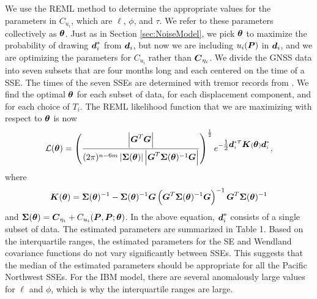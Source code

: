 \documentclass[extra,mreferee]{gji}
\begin{document}

We use the REML method to determine the appropriate values for the
parameters in $C_{u_i}$, which are $\ell$, $\phi$, and $\tau$. We
refer to these parameters collectively as $\mitbf{\theta}$. Just as in
Section \ref{sec:NoiseModel}, we pick $\mitbf{\theta}$ to maximize the
probability of drawing $\data_i^*$ from $\data_i$, but now we are
including $u_i(\points)$ in $\data_i$, and we are optimizing the
parameters for $C_{u_i}$ rather than $\mitbf{C}_{\eta_i}$. We divide
the GNSS data into seven subsets that are four months long and each
centered on the time of a SSE. The times of the seven SSEs are
determined with tremor records from \cite{Wech2010}. We find the
optimal $\mitbf{\theta}$ for each subset of data, for each
displacement component, and for each choice of $T_i$. The REML
likelihood function that we are maximizing with respect to
$\mitbf{\theta}$ is now
\begin{equation}\label{eq:REMLPrior} 
\mathcal{L}(\mitbf{\theta}) =
\left(\frac{\left| \G^T \G \right|}{(2\pi)^{n-6m}
                                    \left| \mitbf{\Sigma}(\mitbf{\theta}) \right| 
                                    \left| \G^T \mitbf{\Sigma}(\mitbf{\theta})^{-1} \G \right|}\right)^{\frac{1}{2}} 
                              e^{-\tfrac{1}{2} \data_i^{*T} \mitbf{K}(\mitbf{\theta}) \data_i^*},
\end{equation}
where
\begin{equation}
\mitbf{K}(\mitbf{\theta}) = \mitbf{\Sigma}(\mitbf{\theta})^{-1} - 
                            \mitbf{\Sigma}(\mitbf{\theta})^{-1} \G
                            \left( \G^T \mitbf{\Sigma}(\mitbf{\theta})^{-1} \G \right)^{-1}
                            \G^T \mitbf{\Sigma}(\mitbf{\theta})^{-1}
\end{equation}
and $\mitbf{\Sigma}(\mitbf{\theta}) = \mitbf{C}_{\eta_i} +
C_{u_i}(\points,\points;\mitbf{\theta})$. In the above equation,
$\data^*_i$ consists of a single subset of data. The estimated
parameters are summarized in Table 1. Based on the interquartile
ranges, the estimated parameters for the SE and Wendland covariance
functions do not vary significantly between SSEs. This suggests that
the median of the estimated parameters should be appropriate for all
the Pacific Northwest SSEs. For the IBM model, there are several
anomalously large values for $\ell$ and $\phi$, which is why the
interquartile ranges are large.
\end{document}
